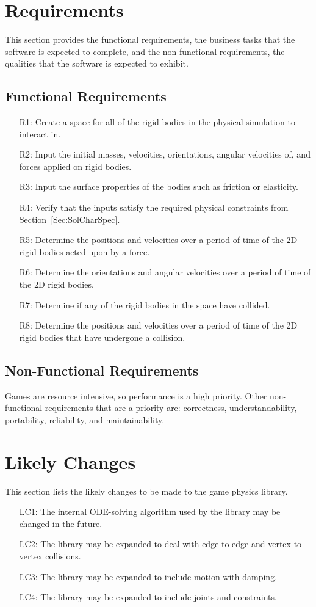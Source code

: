 \documentclass[12pt]{article}
\begin{document}
\section{Requirements}
\label{Sec:Requirements}
This section provides the functional requirements, the business tasks that the software is expected to complete, and the non-functional requirements, the qualities that the software is expected to exhibit.
\subsection{Functional Requirements}
\label{Sec:FRs}
\begin{itemize}
\item[R1:]Create a space for all of the rigid bodies in the physical simulation to interact in.
\item[R2:]Input the initial masses, velocities, orientations, angular velocities of, and forces applied on rigid bodies.
\item[R3:]Input the surface properties of the bodies such as friction or elasticity.
\item[R4:]Verify that the inputs satisfy the required physical constraints from Section~\ref{Sec:SolCharSpec}.
\item[R5:]Determine the positions and velocities over a period of time of the 2D rigid bodies acted upon by a force.
\item[R6:]Determine the orientations and angular velocities over a period of time of the 2D rigid bodies.
\item[R7:]Determine if any of the rigid bodies in the space have collided.
\item[R8:]Determine the positions and velocities over a period of time of the 2D rigid bodies that have undergone a collision.
\end{itemize}
\subsection{Non-Functional Requirements}
\label{Sec:NFRs}
Games are resource intensive, so performance is a high priority. Other non-functional requirements that are a priority are: correctness, understandability, portability, reliability, and maintainability.
\section{Likely Changes}
\label{Sec:LCs}
This section lists the likely changes to be made to the game physics library.
\begin{itemize}
\item[LC1:]The internal ODE-solving algorithm used by the library may be changed in the future.
\item[LC2:]The library may be expanded to deal with edge-to-edge and vertex-to-vertex collisions.
\item[LC3:]The library may be expanded to include motion with damping.
\item[LC4:]The library may be expanded to include joints and constraints.
\end{itemize}
\end{document}
